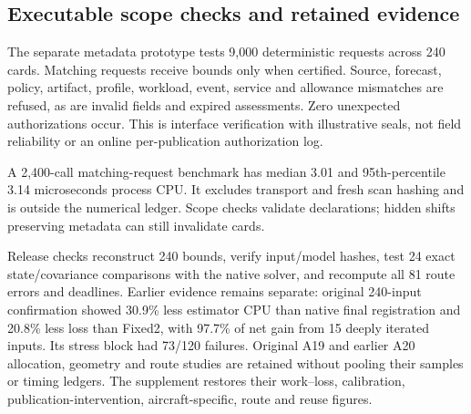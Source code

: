 \subsection{Executable scope checks and retained evidence}
The separate metadata prototype tests 9,000 deterministic requests across 240 cards. Matching requests receive bounds only when certified. Source, forecast, policy, artifact, profile, workload, event, service and allowance mismatches are refused, as are invalid fields and expired assessments. Zero unexpected authorizations occur. This is interface verification with illustrative seals, not field reliability or an online per-publication authorization log.

A 2,400-call matching-request benchmark has median 3.01 and 95th-percentile 3.14 microseconds process CPU. It excludes transport and fresh scan hashing and is outside the numerical ledger. Scope checks validate declarations; hidden shifts preserving metadata can still invalidate cards.

Release checks reconstruct 240 bounds, verify input/model hashes, test 24 exact state/covariance comparisons with the native solver, and recompute all 81 route errors and deadlines. Earlier evidence remains separate: original 240-input confirmation showed 30.9\% less estimator CPU than native final registration and 20.8\% less loss than Fixed2, with 97.7\% of net gain from 15 deeply iterated inputs. Its stress block had 73/120 failures. Original A19 and earlier A20 allocation, geometry and route studies are retained without pooling their samples or timing ledgers. The supplement restores their work--loss, calibration, publication-intervention, aircraft-specific, route and reuse figures.
